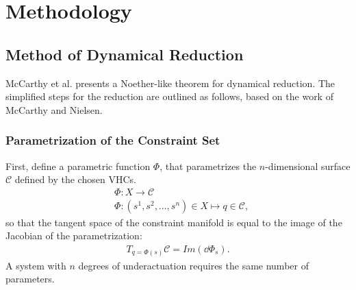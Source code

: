 \documentclass[main.tex]{subfiles}
\begin{document}
\chapter{Methodology}
\section{Method of Dynamical Reduction}
McCarthy et al. presents a Noether-like theorem for dynamical reduction\cite{mccarthy}. The simplified steps for the reduction are outlined as follows, based on the work of McCarthy and Nielsen\cite{nielsen-note}.
\subsection{Parametrization of the Constraint Set}
First, define a parametric function $\Phi$, that parametrizes the $n$-dimensional surface $\mathcal{C}$ defined by the chosen VHCs. 
\begin{align}
&\Phi:X\to\mathcal{C}\\
    &\Phi:(s^1,s^2,\ldots,s^n)\in X \mapsto q\in\mathcal{C},
\end{align}
so that the tangent space of the constraint manifold is equal to the image of the Jacobian of the parametrization:
\begin{align}
T_{q=\Phi(s)}\mathcal{C}=Im(\dd\Phi_s).
\end{align}
A system with $n$ degrees of underactuation requires the same number of parameters.
\end{document}
